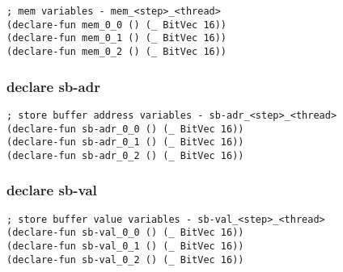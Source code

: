\begin{lstlisting}[language=SMTLib]
; mem variables - mem_<step>_<thread>
(declare-fun mem_0_0 () (_ BitVec 16))
(declare-fun mem_0_1 () (_ BitVec 16))
(declare-fun mem_0_2 () (_ BitVec 16))
\end{lstlisting}

\subsubsection{declare sb-adr}

\begin{algorithm}[H]
\end{algorithm}

\begin{algorithm}[H]
\end{algorithm}

\begin{lstlisting}[language=SMTLib]
; store buffer address variables - sb-adr_<step>_<thread>
(declare-fun sb-adr_0_0 () (_ BitVec 16))
(declare-fun sb-adr_0_1 () (_ BitVec 16))
(declare-fun sb-adr_0_2 () (_ BitVec 16))
\end{lstlisting}

\subsubsection{declare sb-val}

\begin{algorithm}[H]
\end{algorithm}

\begin{algorithm}[H]
\end{algorithm}

\begin{lstlisting}[language=SMTLib]
; store buffer value variables - sb-val_<step>_<thread>
(declare-fun sb-val_0_0 () (_ BitVec 16))
(declare-fun sb-val_0_1 () (_ BitVec 16))
(declare-fun sb-val_0_2 () (_ BitVec 16))
\end{lstlisting}


